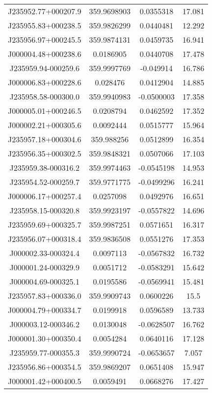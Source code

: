 \begin{table}
\begin{tabular}{cccc}
J235952.77+000207.9 & 359.9698903 & 0.0355318 & 17.081 \\
J235955.83+000238.5 & 359.9826299 & 0.0440481 & 12.292 \\
J235956.97+000245.5 & 359.9874131 & 0.0459735 & 16.941 \\
J000004.48+000238.6 & 0.0186905 & 0.0440708 & 17.478 \\
J235959.94-000259.6 & 359.9997769 & -0.049914 & 16.786 \\
J000006.83+000228.6 & 0.028476 & 0.0412904 & 14.885 \\
J235958.58-000300.0 & 359.9940983 & -0.0500003 & 17.358 \\
J000005.01+000246.5 & 0.0208794 & 0.0462592 & 17.352 \\
J000002.21+000305.6 & 0.0092444 & 0.0515777 & 15.964 \\
J235957.18+000304.6 & 359.988256 & 0.0512899 & 16.354 \\
J235956.35+000302.5 & 359.9848321 & 0.0507066 & 17.103 \\
J235959.38-000316.2 & 359.9974463 & -0.0545198 & 14.953 \\
J235954.52-000259.7 & 359.9771775 & -0.0499296 & 16.241 \\
J000006.17+000257.4 & 0.0257098 & 0.0492976 & 16.651 \\
J235958.15-000320.8 & 359.9923197 & -0.0557822 & 14.696 \\
J235959.69+000325.7 & 359.9987251 & 0.0571651 & 16.317 \\
J235956.07+000318.4 & 359.9836508 & 0.0551276 & 17.353 \\
J000002.33-000324.4 & 0.0097113 & -0.0567832 & 16.732 \\
J000001.24-000329.9 & 0.0051712 & -0.0583291 & 15.642 \\
J000004.69-000325.1 & 0.0195586 & -0.0569941 & 15.481 \\
J235957.83+000336.0 & 359.9909743 & 0.0600226 & 15.5 \\
J000004.79+000334.7 & 0.0199918 & 0.0596589 & 13.733 \\
J000003.12-000346.2 & 0.0130048 & -0.0628507 & 16.762 \\
J000001.30+000350.4 & 0.0054284 & 0.0640116 & 17.128 \\
J235959.77-000355.3 & 359.9990724 & -0.0653657 & 7.057 \\
J235956.86+000354.5 & 359.9869207 & 0.0651408 & 15.947 \\
J000001.42+000400.5 & 0.0059491 & 0.0668276 & 17.427 \\

\end{tabular}
\end{table}
